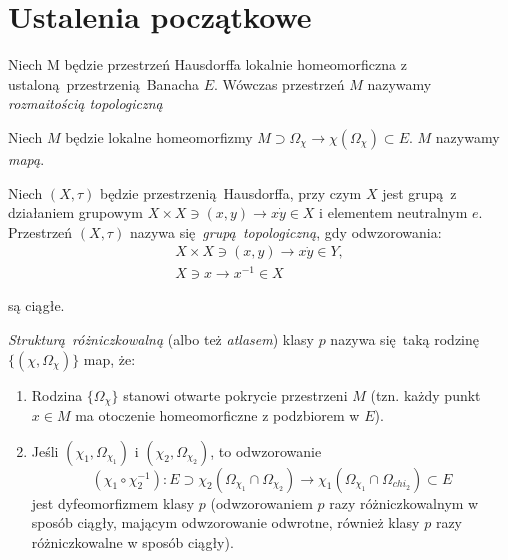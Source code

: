 \chapter{Ustalenia początkowe}
\begin{definicja}\cite[s. 253]{maurin2}
    Niech M będzie przestrzeń Hausdorffa lokalnie homeomorficzna z
    ustaloną przestrzenią Banacha \(E\). Wówczas przestrzeń \(M\) nazywamy \emph{rozmaitością
    topologiczną}
    
    Niech \(M\) będzie lokalne homeomorfizmy
    \(M \supset \Omega_{\chi} \rightarrow \chi(\Omega_{\chi}) \subset E\). \(M\) nazywamy
\emph{mapą}.

\begin{definicja}\cite[s. 41]{maurin2}
    Niech \((X, \tau)\) będzie przestrzenią Hausdorffa, przy czym \(X\) jest grupą z działaniem
    grupowym \(X\times X \ni (x, y) \rightarrow x\dot y \in X\) i elementem neutralnym \(e\).
    Przestrzeń \((X, \tau)\) nazywa się \emph{grupą topologiczną}, gdy odwzorowania:
    \begin{align*}
        X\times X \ni (x, y) \rightarrow x \dot y \in Y, \\ 
        X \ni x \rightarrow x^{-1} \in X
    \end{align*}
\end{definicja} są ciągłe.

\end{definicja}
\begin{definicja}\cite[s. 253]{maurin2}
\emph{Strukturą różniczkowalną} (albo też \emph{atlasem}) klasy \(p\) nazywa się taką
rodzinę \( \{(\chi, \Omega_{\chi})\} \) map, że:
\begin{enumerate}[label=(\alph*)]
    \item Rodzina \(\{\Omega_{\chi}\}\) stanowi otwarte pokrycie przestrzeni \(M\) (tzn. każdy punkt
        \(x\in M\) ma otoczenie homeomorficzne z podzbiorem w \(E\)).
    \item Jeśli \((\chi_1, \Omega_{\chi_1})\) i \((\chi_2, \Omega_{\chi_2})\), to odwzorowanie
        \begin{equation*}
            (\chi_1 \circ \chi_2^{-1}): E \supset \chi_2(\Omega_{\chi_1} \cap \Omega_{\chi_2})
            \rightarrow \chi_1(\Omega_{\chi_1} \cap \Omega_{chi_2}) \subset E 
        \end{equation*}
        jest dyfeomorfizmem klasy \(p\) (odwzorowaniem \(p\) razy różniczkowalnym w sposób ciągły,
        mającym odwzorowanie odwrotne, również klasy \(p\) razy różniczkowalne w sposób ciągły).
\end{enumerate}
\end{definicja}
